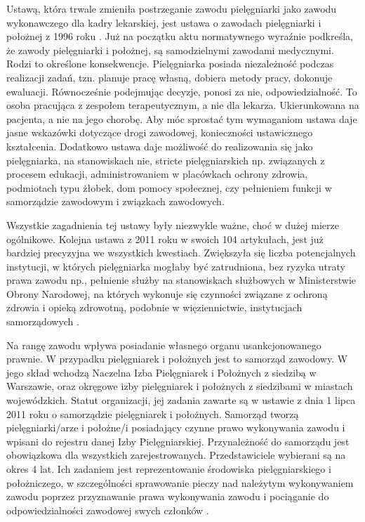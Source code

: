 \documentclass[a4paper,12pt,twoside,openany]{report}
\begin{document}
Ustawą, która trwale zmieniła postrzeganie zawodu pielęgniarki jako zawodu wykonawczego dla kadry lekarskiej, jest ustawa o zawodach pielęgniarki i położnej z 1996 roku \cite{1996}. Już na początku aktu normatywnego wyraźnie podkreśla, że zawody pielęgniarki i położnej, są samodzielnymi zawodami medycznymi. Rodzi to określone konsekwencje. Pielęgniarka posiada niezależność podczas realizacji zadań, tzn. planuje pracę własną, dobiera metody pracy, dokonuje ewaluacji. Równocześnie podejmując decyzje, ponosi za nie, odpowiedzialność. To osoba pracująca z zespołem terapeutycznym, a nie dla lekarza. Ukierunkowana na pacjenta, a nie na jego chorobę. Aby móc sprostać tym wymaganiom ustawa daje jasne wskazówki dotyczące drogi zawodowej, konieczności ustawicznego kształcenia. Dodatkowo ustawa daje możliwość do realizowania się jako pielęgniarka, na stanowiskach nie, stricte pielęgniarskich np. związanych z procesem edukacji, administrowaniem w placówkach ochrony zdrowia, podmiotach typu żłobek, dom pomocy społecznej, czy pełnieniem funkcji w samorządzie zawodowym i związkach zawodowych.

Wszystkie zagadnienia tej ustawy były niezwykle ważne, choć w dużej mierze ogólnikowe. Kolejna ustawa z 2011 roku w swoich 104 artykułach, jest już bardziej precyzyjna we wszystkich kwestiach. Zwiększyła się liczba potencjalnych instytucji, w których pielęgniarka mogłaby być zatrudniona, bez ryzyka utraty prawa zawodu np., pełnienie służby na stanowiskach służbowych w Ministerstwie Obrony Narodowej, na których wykonuje się czynności związane z ochroną zdrowia i opieką zdrowotną, podobnie w więziennictwie, instytucjach samorządowych \cite{2011}. 

Na rangę zawodu wpływa posiadanie własnego organu usankcjonowanego prawnie. W przypadku pielęgniarek i położnych jest to samorząd zawodowy. W jego skład wchodzą Naczelna Izba Pielęgniarek i Położnych z siedzibą w Warszawie, oraz okręgowe izby pielęgniarek i położnych z siedzibami w miastach wojewódzkich. Statut organizacji, jej zadania zawarte są w ustawie z dnia 1 lipca 2011 roku o samorządzie pielęgniarek i położnych. Samorząd tworzą pielęgniarki/arze i położne/i posiadający czynne prawo wykonywania zawodu i wpisani do rejestru danej Izby Pielęgniarskiej. Przynależność do samorządu jest obowiązkowa dla wszystkich zarejestrowanych. Przedstawiciele wybierani są na okres 4 lat. Ich zadaniem jest reprezentowanie środowiska pielęgniarskiego i położniczego, w szczególności sprawowanie pieczy nad należytym wykonywaniem zawodu poprzez przyznawanie prawa wykonywania zawodu i pociąganie do odpowiedzialności zawodowej swych członków \cite{nipip}.
\end{document}
